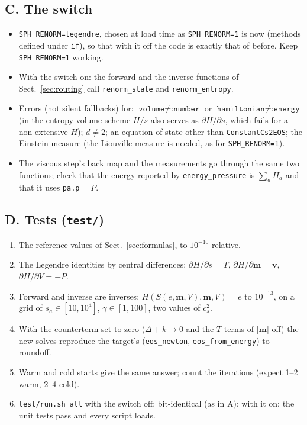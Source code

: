 \documentclass[11pt,aps,preprint,nofootinbib,superscriptaddress,tightenlines]{revtex4-2}
\def\Sect#1{Sect.~\ref{#1}}
\begin{document}
\subsection{C. The switch}
\label{sec:switch}

\begin{itemize}
\item \texttt{SPH\_RENORM=legendre}, chosen at load time as \texttt{SPH\_RENORM=1} is now (methods defined under \texttt{if}), so that with it off the code is
  exactly that of before.  Keep \texttt{SPH\_RENORM=1} working.
\item With the switch on: the forward and the inverse functions of \Sect{sec:routing} call \texttt{renorm\_state} and \texttt{renorm\_entropy}.
\item Errors (not silent fallbacks) for: $\texttt{volume}\neq\texttt{:number}$ or $\texttt{hamiltonian}\neq\texttt{:energy}$ (in the entropy-volume scheme $H/s$
  also serves as $\partial H/\partial s$, which fails for a non-extensive $H$); $d\neq2$; an equation of state other than \texttt{ConstantCs2EOS}; the Einstein
  measure (the Liouville measure is needed, as for \texttt{SPH\_RENORM=1}).
\item The viscous step's back map and the measurements go through the same two functions; check that the energy reported by \texttt{energy\_pressure}
  is $\sum_aH_a$ and that it uses \texttt{pa.p}$=P$.
\end{itemize}

\subsection{D. Tests (\texttt{test/})}
\label{sec:tests}

\begin{enumerate}
\item The reference values of \Sect{sec:formulas}, to $10^{-10}$ relative.
\item The Legendre identities by central differences: $\partial H/\partial s=T$, $\partial H/\partial\bm m=\bm v$, $\partial H/\partial V=-P$.
\item Forward and inverse are inverses: $H(S(e,\bm m,V),\bm m,V)=e$ to $10^{-13}$, on a grid of $s_a\in[10,10^4]$, $\gamma\in[1,100]$, two values of $c_s^2$.
\item With the counterterm set to zero ($\Delta+k\to0$ and the $T$-terms of $|\bm m|$ off) the new solves reproduce the target's (\texttt{eos\_newton},
  \texttt{eos\_from\_energy}) to roundoff.
\item Warm and cold starts give the same answer; count the iterations (expect 1--2 warm, 2--4 cold).
\item \texttt{test/run.sh all} with the switch off: bit-identical (as in A); with it on: the unit tests pass and every script loads.
\end{enumerate}
\end{document}
